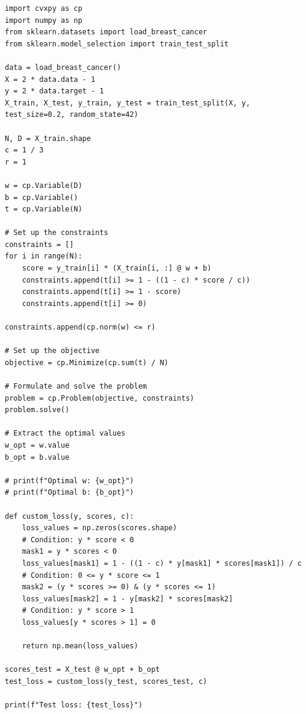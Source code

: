 \documentclass{article}
\begin{document}
\begin{small}
\begin{verbatim}
import cvxpy as cp
import numpy as np
from sklearn.datasets import load_breast_cancer
from sklearn.model_selection import train_test_split

data = load_breast_cancer()
X = 2 * data.data - 1
y = 2 * data.target - 1
X_train, X_test, y_train, y_test = train_test_split(X, y, test_size=0.2, random_state=42)

N, D = X_train.shape
c = 1 / 3
r = 1

w = cp.Variable(D)
b = cp.Variable()
t = cp.Variable(N)

# Set up the constraints
constraints = []
for i in range(N):
    score = y_train[i] * (X_train[i, :] @ w + b)
    constraints.append(t[i] >= 1 - ((1 - c) * score / c))
    constraints.append(t[i] >= 1 - score)
    constraints.append(t[i] >= 0)

constraints.append(cp.norm(w) <= r)

# Set up the objective
objective = cp.Minimize(cp.sum(t) / N)

# Formulate and solve the problem
problem = cp.Problem(objective, constraints)
problem.solve()

# Extract the optimal values
w_opt = w.value
b_opt = b.value

# print(f"Optimal w: {w_opt}")
# print(f"Optimal b: {b_opt}")

def custom_loss(y, scores, c):
    loss_values = np.zeros(scores.shape)
    # Condition: y * score < 0
    mask1 = y * scores < 0
    loss_values[mask1] = 1 - ((1 - c) * y[mask1] * scores[mask1]) / c
    # Condition: 0 <= y * score <= 1
    mask2 = (y * scores >= 0) & (y * scores <= 1)
    loss_values[mask2] = 1 - y[mask2] * scores[mask2]
    # Condition: y * score > 1
    loss_values[y * scores > 1] = 0
    
    return np.mean(loss_values)

scores_test = X_test @ w_opt + b_opt
test_loss = custom_loss(y_test, scores_test, c)

print(f"Test loss: {test_loss}")
\end{verbatim}
\end{small}
\end{document}
